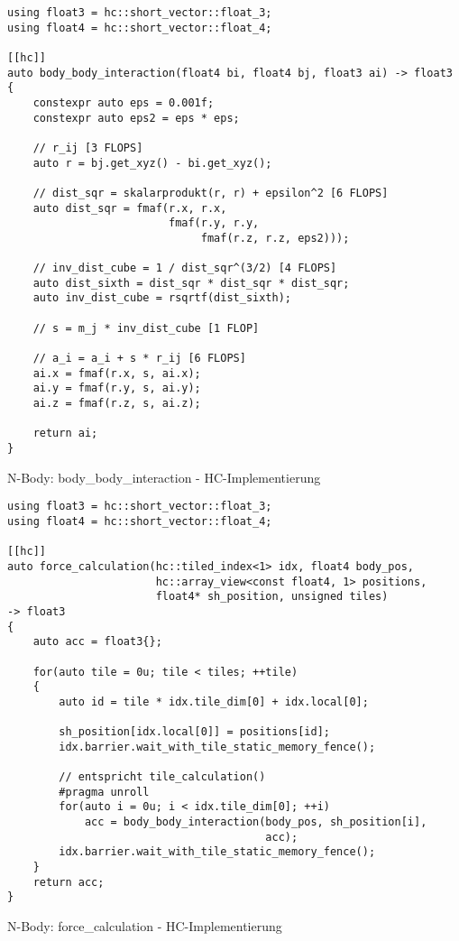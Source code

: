 \begin{code}
    \begin{verbatim}
using float3 = hc::short_vector::float_3;
using float4 = hc::short_vector::float_4;

[[hc]]
auto body_body_interaction(float4 bi, float4 bj, float3 ai) -> float3
{
    constexpr auto eps = 0.001f;
    constexpr auto eps2 = eps * eps;

    // r_ij [3 FLOPS]
    auto r = bj.get_xyz() - bi.get_xyz();

    // dist_sqr = skalarprodukt(r, r) + epsilon^2 [6 FLOPS]
    auto dist_sqr = fmaf(r.x, r.x,
                         fmaf(r.y, r.y,
                              fmaf(r.z, r.z, eps2)));

    // inv_dist_cube = 1 / dist_sqr^(3/2) [4 FLOPS]
    auto dist_sixth = dist_sqr * dist_sqr * dist_sqr;
    auto inv_dist_cube = rsqrtf(dist_sixth);

    // s = m_j * inv_dist_cube [1 FLOP]

    // a_i = a_i + s * r_ij [6 FLOPS]
    ai.x = fmaf(r.x, s, ai.x);
    ai.y = fmaf(r.y, s, ai.y);
    ai.z = fmaf(r.z, s, ai.z);

    return ai;
}
    \end{verbatim}
    \caption{N-Body: body\_body\_interaction - HC-Implementierung}
    \label{anhang:hc:bodybodyinteraction}
\end{code}

\begin{code}
    \begin{verbatim}
using float3 = hc::short_vector::float_3;
using float4 = hc::short_vector::float_4;

[[hc]]
auto force_calculation(hc::tiled_index<1> idx, float4 body_pos,
                       hc::array_view<const float4, 1> positions,
                       float4* sh_position, unsigned tiles)
-> float3
{
    auto acc = float3{};

    for(auto tile = 0u; tile < tiles; ++tile)
    {
        auto id = tile * idx.tile_dim[0] + idx.local[0];

        sh_position[idx.local[0]] = positions[id];
        idx.barrier.wait_with_tile_static_memory_fence();

        // entspricht tile_calculation()
        #pragma unroll
        for(auto i = 0u; i < idx.tile_dim[0]; ++i)
            acc = body_body_interaction(body_pos, sh_position[i],
                                        acc);
        idx.barrier.wait_with_tile_static_memory_fence();
    }
    return acc;
}
    \end{verbatim}
    \caption{N-Body: force\_calculation - HC-Implementierung}
    \label{anhang:hc:forcecalculation}
\end{code}

